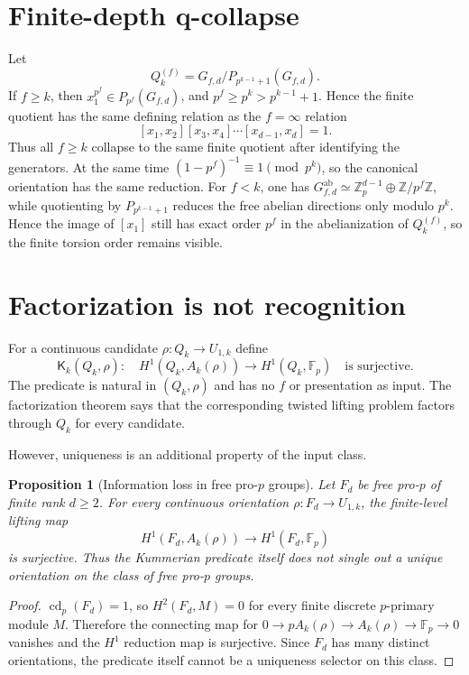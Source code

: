 \documentclass[11pt]{article}
\newtheorem{proposition}[theorem]{Proposition}
\begin{document}
\section{Finite-depth q-collapse}
Let
\[
Q_k^{(f)}=G_{f,d}/P_{p^{k-1}+1}(G_{f,d}).
\]
If $f\ge k$, then $x_1^{p^f}\in P_{p^f}(G_{f,d})$, and $p^f\ge p^k>p^{k-1}+1$. Hence the finite quotient has the same defining relation as the $f=\infty$ relation
\[
[x_1,x_2][x_3,x_4]\cdots[x_{d-1},x_d]=1.
\]
Thus all $f\ge k$ collapse to the same finite quotient after identifying the generators. At the same time
$(1-p^f)^{-1}\equiv1\pmod{p^k}$, so the canonical orientation has the same reduction.
For $f<k$, one has $G_{f,d}^{\mathrm{ab}}\simeq \mathbb Z_p^{d-1}\oplus\mathbb Z/p^f\mathbb Z$, while quotienting by $P_{p^{k-1}+1}$ reduces the free abelian directions only modulo $p^k$. Hence the image of $[x_1]$ still has exact order $p^f$ in the abelianization of $Q_k^{(f)}$, so the finite torsion order remains visible.

\section{Factorization is not recognition}
For a continuous candidate $\rho:Q_k\to U_{1,k}$ define
\[
\mathsf K_k(Q_k,\rho):\quad
H^1(Q_k,A_k(\rho))\longrightarrow H^1(Q_k,\mathbb F_p)
\quad\text{is surjective}.
\]
The predicate is natural in $(Q_k,\rho)$ and has no $f$ or presentation as input. The factorization theorem says that the corresponding twisted lifting problem factors through $Q_k$ for every candidate.

However, uniqueness is an additional property of the input class.

\begin{proposition}[Information loss in free pro-$p$ groups]
Let $F_d$ be free pro-$p$ of finite rank $d\ge2$. For every continuous orientation $\rho:F_d\to U_{1,k}$, the finite-level lifting map
\[
H^1(F_d,A_k(\rho))\longrightarrow H^1(F_d,\mathbb F_p)
\]
is surjective. Thus the Kummerian predicate itself does not single out a unique orientation on the class of free pro-$p$ groups.
\end{proposition}

\begin{proof}
$\operatorname{cd}_p(F_d)=1$, so $H^2(F_d,M)=0$ for every finite discrete $p$-primary module $M$. Therefore the connecting map for
$0\to pA_k(\rho)\to A_k(\rho)\to\mathbb F_p\to0$
vanishes and the $H^1$ reduction map is surjective. Since $F_d$ has many distinct orientations, the predicate itself cannot be a uniqueness selector on this class.
\end{proof}
\end{document}
